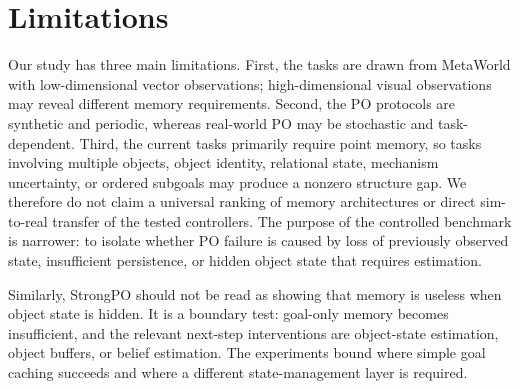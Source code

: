 \section{Limitations}
\label{sec:limitations}

Our study has three main limitations. First, the tasks are drawn from MetaWorld with low-dimensional vector observations; high-dimensional visual observations may reveal different memory requirements. Second, the PO protocols are synthetic and periodic, whereas real-world PO may be stochastic and task-dependent. Third, the current tasks primarily require point memory, so tasks involving multiple objects, object identity, relational state, mechanism uncertainty, or ordered subgoals may produce a nonzero structure gap. We therefore do not claim a universal ranking of memory architectures or direct sim-to-real transfer of the tested controllers. The purpose of the controlled benchmark is narrower: to isolate whether PO failure is caused by loss of previously observed state, insufficient persistence, or hidden object state that requires estimation.

Similarly, StrongPO should not be read as showing that memory is useless when object state is hidden. It is a boundary test: goal-only memory becomes insufficient, and the relevant next-step interventions are object-state estimation, object buffers, or belief estimation. The experiments bound where simple goal caching succeeds and where a different state-management layer is required.
